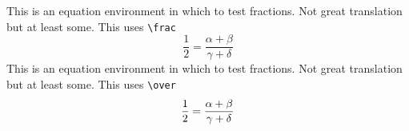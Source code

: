 \documentclass{article}
\begin{document}
This is an equation environment in which to test fractions.  Not great translation
but at least some.   This uses \verb#\frac#
$$
\frac{1}{2} = \frac{\alpha+\beta}{\gamma+\delta}
$$
This is an equation environment in which to test fractions.  Not great translation
but at least some.  This uses \verb#\over#
$$
{1 \over 2} = {\alpha+\beta \over \gamma+\delta}
$$
\end{document}
